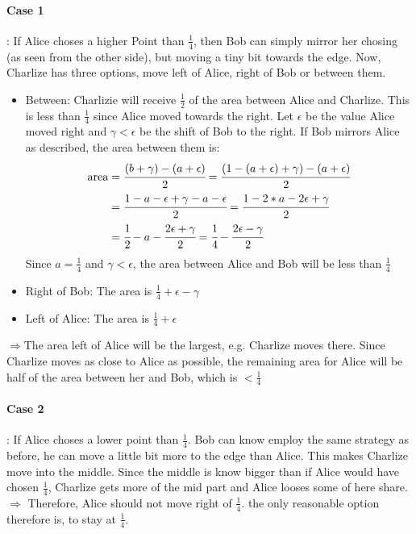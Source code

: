 \documentclass[11pt]{article}
\begin{document}
    \paragraph*{Case 1}: If Alice choses a higher Point than $\frac{1}{4}$, then Bob can simply mirror her chosing (as seen from the other side), but moving a tiny bit towards the edge.
    Now, Charlize has three options, move left of Alice, right of Bob or between them.\\
    \begin{itemize}
        \item Between: Charlizie will receive $\frac{1}{2}$ of the area between Alice and Charlize. This is less than $\frac{1}{4}$ since Alice
        moved towards the right. Let $\epsilon$ be the value Alice moved right and $\gamma<\epsilon$ be the shift of Bob to the right. If Bob mirrors Alice as described,
        the area between them is: 
        \begin{equation}
            \begin{split}
            \text{area}&=\cfrac{(b+\gamma)-(a+\epsilon)}{2}=\cfrac{(1-(a+\epsilon)+\gamma)-(a+\epsilon)}{2}\\
            &=\cfrac{1-a-\epsilon+\gamma-a-\epsilon}{2}=\cfrac{1-2*a-2\epsilon+\gamma}{2}\\
            &=\cfrac{1}{2}-a-\cfrac{2\epsilon+\gamma}{2}=\cfrac{1}{4}-\cfrac{2\epsilon-\gamma}{2}
            \end{split}
        \end{equation}
        Since $a=\frac{1}{4}$ and $\gamma<\epsilon$, the area between Alice and Bob will be less than $\frac{1}{4}$
        \item Right of Bob: The area is $\frac{1}{4}+\epsilon-\gamma$ 
        \item Left of Alice: The area is $\frac{1}{4}+\epsilon$
    \end{itemize}
    $\Rightarrow$The area left of Alice will be the largest, e.g. Charlize moves there. Since Charlize moves as close to
    Alice as possible, the remaining area for Alice will be half of the area between her and Bob, which is $<\frac{1}{4}$
    
    \paragraph*{Case 2}: If Alice choses a lower point than $\frac{1}{4}$. Bob can know employ the same strategy as before,
    he can move a little bit more to the edge than Alice. This makes Charlize move into the middle. Since the middle is know
    bigger than if Alice would have chosen $\frac{1}{4}$, Charlize gets more of the mid part and Alice looses some of here share.
    $\Rightarrow$ Therefore, Alice should not move right of $\frac{1}{4}$. the only reasonable option therefore is, to stay at
    $\frac{1}{4}$.
\end{document}

